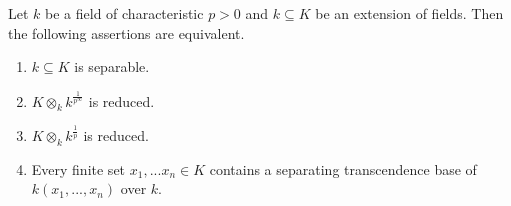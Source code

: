 \begin{theorem}\label{theorem:macLanes_criterion}
Let $k$ be a field of characteristic $p > 0$ and $k\subseteq K$ be an extension of fields. Then the following assertions are equivalent.
\begin{enumerate}[label=\emph{\textbf{(\roman*)}}, leftmargin=3.0em]
\item $k\subseteq K$ is separable.
\item $K\otimes_kk^{\frac{1}{p^{\infty}}}$ is reduced.
\item $K\otimes_kk^{\frac{1}{p}}$ is reduced.
\item Every finite set $x_1,...x_n\in K$ contains a separating transcendence base of $k(x_1,...,x_n)$ over $k$. 
\end{enumerate}
\end{theorem}
